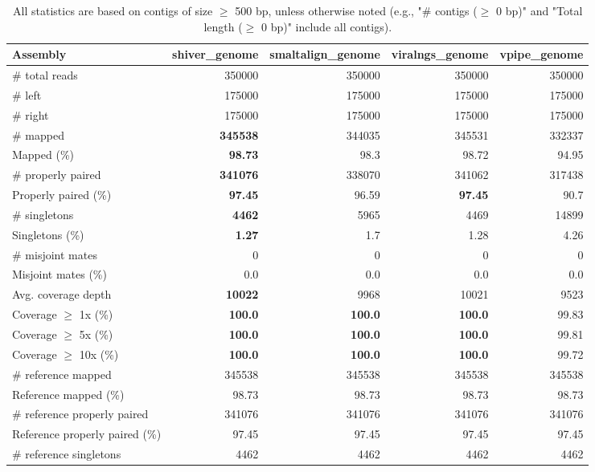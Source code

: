 \documentclass[12pt,a4paper]{article}
\begin{document}
\begin{table}[ht]
\begin{center}
\caption{All statistics are based on contigs of size $\geq$ 500 bp, unless otherwise noted (e.g., "\# contigs ($\geq$ 0 bp)" and "Total length ($\geq$ 0 bp)" include all contigs).}
\begin{tabular}{|l*{4}{|r}|}
\hline
Assembly & shiver\_genome & smaltalign\_genome & viralngs\_genome & vpipe\_genome \\ \hline
\# total reads & 350000 & 350000 & 350000 & 350000 \\ \hline
\# left & 175000 & 175000 & 175000 & 175000 \\ \hline
\# right & 175000 & 175000 & 175000 & 175000 \\ \hline
\# mapped & {\bf 345538} & 344035 & 345531 & 332337 \\ \hline
Mapped (\%) & {\bf 98.73} & 98.3 & 98.72 & 94.95 \\ \hline
\# properly paired & {\bf 341076} & 338070 & 341062 & 317438 \\ \hline
Properly paired (\%) & {\bf 97.45} & 96.59 & {\bf 97.45} & 90.7 \\ \hline
\# singletons & {\bf 4462} & 5965 & 4469 & 14899 \\ \hline
Singletons (\%) & {\bf 1.27} & 1.7 & 1.28 & 4.26 \\ \hline
\# misjoint mates & 0 & 0 & 0 & 0 \\ \hline
Misjoint mates (\%) & 0.0 & 0.0 & 0.0 & 0.0 \\ \hline
Avg. coverage depth & {\bf 10022} & 9968 & 10021 & 9523 \\ \hline
Coverage $\geq$ 1x (\%) & {\bf 100.0} & {\bf 100.0} & {\bf 100.0} & 99.83 \\ \hline
Coverage $\geq$ 5x (\%) & {\bf 100.0} & {\bf 100.0} & {\bf 100.0} & 99.81 \\ \hline
Coverage $\geq$ 10x (\%) & {\bf 100.0} & {\bf 100.0} & {\bf 100.0} & 99.72 \\ \hline
\# reference mapped & 345538 & 345538 & 345538 & 345538 \\ \hline
Reference mapped (\%) & 98.73 & 98.73 & 98.73 & 98.73 \\ \hline
\# reference properly paired & 341076 & 341076 & 341076 & 341076 \\ \hline
Reference properly paired (\%) & 97.45 & 97.45 & 97.45 & 97.45 \\ \hline
\# reference singletons & 4462 & 4462 & 4462 & 4462 \\ \hline

\end{tabular}
\end{center}
\end{table}
\end{document}

